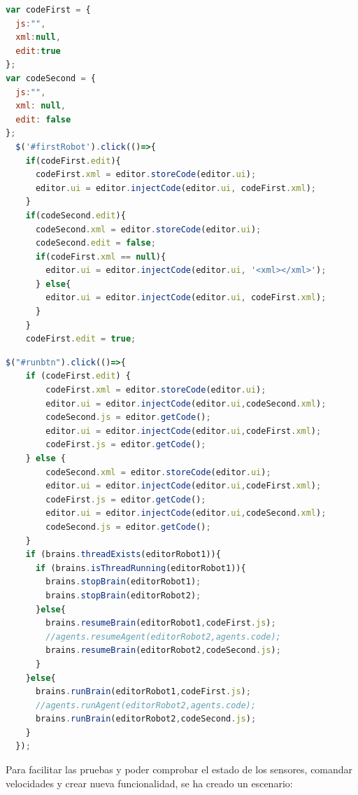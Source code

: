 \begin{lstlisting}[language=javascript,label=lst:savecode, caption=código \textit{JavaScript} para guardar código de un robot]
var codeFirst = {
  js:"",
  xml:null,
  edit:true
};
var codeSecond = {
  js:"",
  xml: null,
  edit: false
};
  $('#firstRobot').click(()=>{
    if(codeFirst.edit){
      codeFirst.xml = editor.storeCode(editor.ui);
      editor.ui = editor.injectCode(editor.ui, codeFirst.xml);
    }
    if(codeSecond.edit){
      codeSecond.xml = editor.storeCode(editor.ui);
      codeSecond.edit = false;
      if(codeFirst.xml == null){
        editor.ui = editor.injectCode(editor.ui, '<xml></xml>');
      } else{
        editor.ui = editor.injectCode(editor.ui, codeFirst.xml);
      }
    }
    codeFirst.edit = true;
\end{lstlisting}

\begin{lstlisting}[language=javascript,caption=código \textit{JavaScript} para ejecutar código de los robots y guardar el que se esté editando]
$("#runbtn").click(()=>{
    if (codeFirst.edit) {
        codeFirst.xml = editor.storeCode(editor.ui);
        editor.ui = editor.injectCode(editor.ui,codeSecond.xml);
        codeSecond.js = editor.getCode();
        editor.ui = editor.injectCode(editor.ui,codeFirst.xml);
        codeFirst.js = editor.getCode();
    } else {
        codeSecond.xml = editor.storeCode(editor.ui);
        editor.ui = editor.injectCode(editor.ui,codeFirst.xml);
        codeFirst.js = editor.getCode();
        editor.ui = editor.injectCode(editor.ui,codeSecond.xml);
        codeSecond.js = editor.getCode();
    }
    if (brains.threadExists(editorRobot1)){
      if (brains.isThreadRunning(editorRobot1)){
        brains.stopBrain(editorRobot1);
        brains.stopBrain(editorRobot2);
      }else{
        brains.resumeBrain(editorRobot1,codeFirst.js);
        //agents.resumeAgent(editorRobot2,agents.code);
        brains.resumeBrain(editorRobot2,codeSecond.js);
      }
    }else{
      brains.runBrain(editorRobot1,codeFirst.js);
      //agents.runAgent(editorRobot2,agents.code);
      brains.runBrain(editorRobot2,codeSecond.js);
    }
  });
\end{lstlisting}

Para facilitar las pruebas y poder comprobar el estado de los sensores, comandar velocidades y crear nueva funcionalidad, se ha creado un escenario:
      
